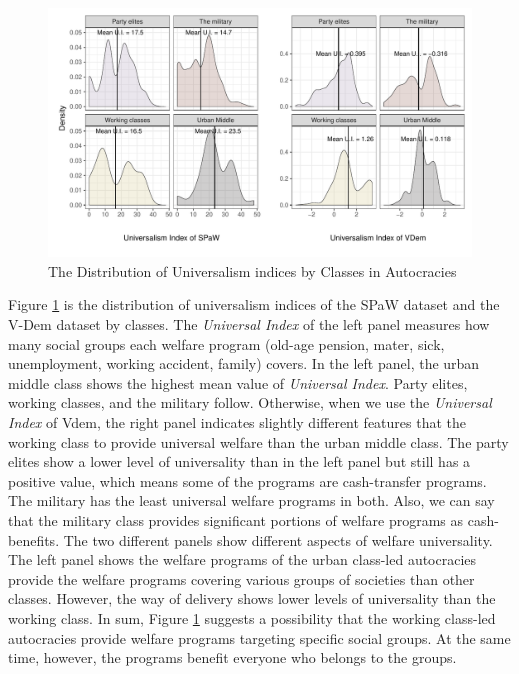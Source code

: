 \documentclass[11pt]{article}
\begin{document}
\begin{figure}[!htbt]
	\centering
	\includegraphics[width=1\linewidth]{"../3. Datasets_Codebooks/Figures/Plot2"}
	\caption{The Distribution of Universalism indices by Classes in Autocracies}
	\label{fig:plot3}
\end{figure}

Figure \ref{fig:plot3} is the distribution of universalism indices of the SPaW dataset and the V-Dem dataset by classes. The \textit{Universal Index} of the left panel measures how many social groups each welfare program (old-age pension, mater, sick, unemployment, working accident, family) covers. In the left panel, the urban middle class shows the highest mean value of \textit{Universal Index}. Party elites, working classes, and the military follow. Otherwise, when we use the \textit{Universal Index} of Vdem, the right panel indicates slightly different features that the working class to provide universal welfare than the urban middle class. The party elites show a lower level of universality than in the left panel but still has a positive value, which means some of the programs are cash-transfer programs. The military has the least universal welfare programs in both. Also, we can say that the military class provides significant portions of welfare programs as cash-benefits. The two different panels show different aspects of welfare universality. The left panel shows the welfare programs of the urban class-led autocracies provide the welfare programs covering various groups of societies than other classes. However, the way of delivery shows lower levels of universality than the working class. In sum, Figure \ref{fig:plot3} suggests a possibility that the working class-led autocracies provide welfare programs targeting specific social groups. At the same time, however, the programs benefit everyone who belongs to the groups.
\end{document}
